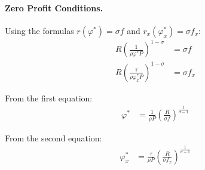\begin{solution}
			\paragraph{Zero Profit Conditions.} Using the formulas $r(\varphi^*) = \sigma f$ and $r_x(\varphi_x^*) = \sigma f_x$:
			\begin{align*}
				R \left( \frac{1}{\rho \varphi^* P} \right)^{1 - \sigma} &= \sigma f \\
				R \left( \frac{\tau}{\rho \varphi_x^* P} \right)^{1 - \sigma} &= \sigma f_x
			\end{align*}

			From the first equation:
			\begin{align*}
				\varphi^* &= \frac{1}{\rho P} \left( \frac{R}{\sigma f} \right)^{\frac{1}{\sigma-1}}
			\end{align*}

			From the second equation:
			\begin{align*}
				\varphi_x^* &= \frac{\tau}{\rho P} \left( \frac{R}{\sigma f_x} \right)^{\frac{1}{\sigma-1}}
			\end{align*}
\end{solution}